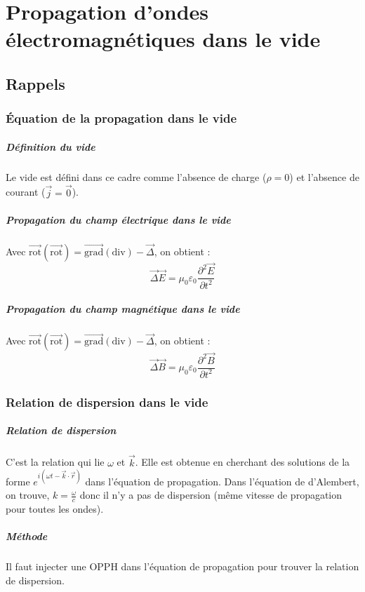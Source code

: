\documentclass[french]{book}
\theoremstyle{plain}
\theoremstyle{definition}
\theoremstyle{remark}
\newcommand{\grad}{\overrightarrow{\text{grad}}}
\newcommand{\rot}{\overrightarrow{\text{rot}}}
\renewcommand{\div}{\text{div}}
\begin{document}
\chapter{Propagation d'ondes électromagnétiques dans le vide}
\localtableofcontents
\section{Rappels}
\subsection{Équation de la propagation dans le vide}
\paragraph{Définition du vide} Le vide est défini dans ce cadre comme l'absence de charge ($\rho=0$) et l'absence de courant ($\overrightarrow{j}=\overrightarrow{0}$).
\paragraph{Propagation du champ électrique dans le vide} Avec $\rot(\rot)=\grad(\div)-\overrightarrow{\Delta}$, on obtient : $$\overrightarrow{\Delta}\overrightarrow{E}=\mu_0\varepsilon_0\frac{\partial^2 \overrightarrow{E}}{\partial t^2}$$
\paragraph{Propagation du champ magnétique dans le vide} Avec $\rot(\rot)=\grad(\div)-\overrightarrow{\Delta}$, on obtient : $$\overrightarrow{\Delta}\overrightarrow{B}=\mu_0\varepsilon_0\frac{\partial^2 \overrightarrow{B}}{\partial t^2}$$
\subsection{Relation de dispersion dans le vide}
\paragraph{Relation de dispersion} C'est la relation qui lie $\omega$ et $\overrightarrow{k}$. Elle est obtenue en cherchant des solutions de la forme $e^{i(\omega t-\overrightarrow{k}\cdot\overrightarrow{r})}$ dans l’équation de propagation. Dans l’équation de d’Alembert, on trouve, $\displaystyle k=\frac{\omega}{c}$ donc il n’y a pas de dispersion (même vitesse de propagation pour toutes les ondes).
\paragraph{Méthode} Il faut injecter une OPPH dans l'équation de propagation pour trouver la relation de dispersion.
\end{document}
